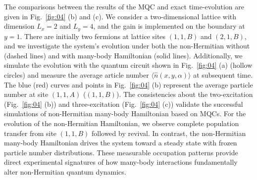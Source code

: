 \documentclass[longbibliography, aps, prx, amsmath, amssymb, amsfonts, twocolumn,superscriptaddress, footinbib]{revtex4-1}
\begin{document}
	The comparisons between the results of the MQC and exact time-evolution are given in Fig.~\ref{fig:04} (b) and (c). 
	We consider a two-dimensional lattice with dimension $L_x=2$ and $L_y=4$, and the gain is implemented on the boundary at $y=1$. 
	There are initially two fermions at lattice sites $(1,1,B)$ and $(2,1,B)$, %
    and we investigate the system's evolution under both the non-Hermitian without (dashed lines) and with many-body Hamiltonian (solid lines). Additionally, we simulate the evolution with the quantum circuit shown in Fig.~\ref{fig:04} (a) (hollow circles) and measure the average article number $\langle \hat{n}(x,y,\alpha)\rangle$ at subsequent time. The blue (red) curves and points in Fig.~\ref{fig:04} (b) represent the average particle number at site $(1,1,A)$ ($(1,1,B)$).
	The consistencies about the two-excitation (Fig.~\ref{fig:04} (b)) and three-excitation (Fig.~\ref{fig:04} (c)) validate the successful simulations of non-Hermitian many-body Hamiltonian based on MQCs. 
	For the evolution of the non-Hermitian Hamiltonian, we observe complete population transfer from site $(1,1,B)$ followed by revival.
	In contrast, the non-Hermitian many-body Hamiltonian drives the system toward a steady state with frozen particle number distributions.
	These measurable occupation patterns provide direct experimental signatures of how many-body interactions fundamentally alter non-Hermitian quantum dynamics.
\end{document}
